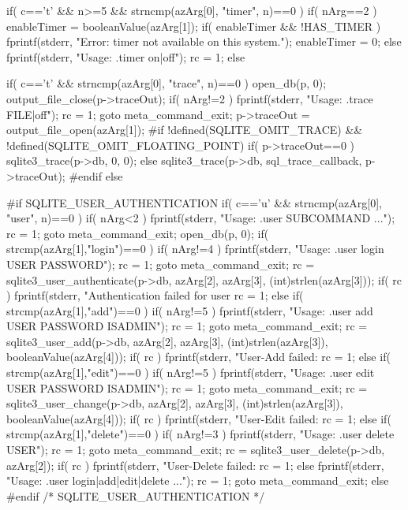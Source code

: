 \begin{Codex}[label=shell.c,numbers=left]
{  if( c=='t' && n>=5 && strncmp(azArg[0], "timer", n)==0 ){
    if( nArg==2 ){
      enableTimer = booleanValue(azArg[1]);
      if( enableTimer && !HAS_TIMER ){
        fprintf(stderr, "Error: timer not available on this system.\n");
        enableTimer = 0;
      }
    }else{
      fprintf(stderr, "Usage: .timer on|off\n");
      rc = 1;
    }
  }else
  
  if( c=='t' && strncmp(azArg[0], "trace", n)==0 ){
    open_db(p, 0);
    output_file_close(p->traceOut);
    if( nArg!=2 ){
      fprintf(stderr, "Usage: .trace FILE|off\n");
      rc = 1;
      goto meta_command_exit;
    }
    p->traceOut = output_file_open(azArg[1]);
#if !defined(SQLITE_OMIT_TRACE) && !defined(SQLITE_OMIT_FLOATING_POINT)
    if( p->traceOut==0 ){
      sqlite3_trace(p->db, 0, 0);
    }else{
      sqlite3_trace(p->db, sql_trace_callback, p->traceOut);
    }
#endif
  }else

#if SQLITE_USER_AUTHENTICATION
  if( c=='u' && strncmp(azArg[0], "user", n)==0 ){
    if( nArg<2 ){
      fprintf(stderr, "Usage: .user SUBCOMMAND ...\n");
      rc = 1;
      goto meta_command_exit;
    }
    open_db(p, 0);
    if( strcmp(azArg[1],"login")==0 ){
      if( nArg!=4 ){
        fprintf(stderr, "Usage: .user login USER PASSWORD\n");
        rc = 1;
        goto meta_command_exit;
      }
      rc = sqlite3_user_authenticate(p->db, azArg[2], azArg[3],
                                    (int)strlen(azArg[3]));
      if( rc ){
        fprintf(stderr, "Authentication failed for user %
        rc = 1;
      }
    }else if( strcmp(azArg[1],"add")==0 ){
      if( nArg!=5 ){
        fprintf(stderr, "Usage: .user add USER PASSWORD ISADMIN\n");
        rc = 1;
        goto meta_command_exit;
      }
      rc = sqlite3_user_add(p->db, azArg[2],
                            azArg[3], (int)strlen(azArg[3]),
                            booleanValue(azArg[4]));
      if( rc ){
        fprintf(stderr, "User-Add failed: %
        rc = 1;
      }
    }else if( strcmp(azArg[1],"edit")==0 ){
      if( nArg!=5 ){
        fprintf(stderr, "Usage: .user edit USER PASSWORD ISADMIN\n");
        rc = 1;
        goto meta_command_exit;
      }
      rc = sqlite3_user_change(p->db, azArg[2],
                              azArg[3], (int)strlen(azArg[3]),
                              booleanValue(azArg[4]));
      if( rc ){
        fprintf(stderr, "User-Edit failed: %
        rc = 1;
      }
    }else if( strcmp(azArg[1],"delete")==0 ){
      if( nArg!=3 ){
        fprintf(stderr, "Usage: .user delete USER\n");
        rc = 1;
        goto meta_command_exit;
      }
      rc = sqlite3_user_delete(p->db, azArg[2]);
      if( rc ){
        fprintf(stderr, "User-Delete failed: %
        rc = 1;
      }
    }else{
      fprintf(stderr, "Usage: .user login|add|edit|delete ...\n");
      rc = 1;
      goto meta_command_exit;
    }    
  }else
#endif /* SQLITE_USER_AUTHENTICATION */

}
\end{Codex}
